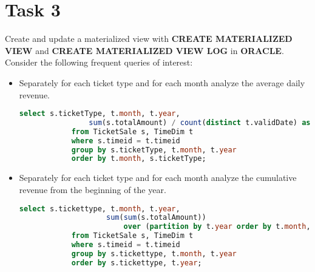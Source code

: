 \section{Task 3}

\begin{question}
   Create and update a materialized view with \textbf{CREATE MATERIALIZED VIEW} and
   \textbf{CREATE MATERIALIZED VIEW LOG} in \textbf{ORACLE}.\\
   Consider the following frequent queries of interest:
   \begin{itemize}
       \item
       Separately for each ticket type and for each month analyze the average daily
       revenue.
       \begin{lstlisting}[language=SQL]
            select s.ticketType, t.month, t.year,
                sum(s.totalAmount) / count(distinct t.validDate) as AVGDailyRevenue
            from TicketSale s, TimeDim t
            where s.timeid = t.timeid
            group by s.ticketType, t.month, t.year
            order by t.month, s.ticketType;
       \end{lstlisting}
       \item
       Separately for each ticket type and for each month analyze the cumulative revenue
       from the beginning of the year.
       \begin{lstlisting}[language=SQL]
            select s.tickettype, t.month, t.year,
                    sum(sum(s.totalAmount))
                        over (partition by t.year order by t.month, t.year) as AccRevenue
            from TicketSale s, TimeDim t
            where s.timeid = t.timeid
            group by s.tickettype, t.month, t.year
            order by s.tickettype, t.year;



\end{lstlisting}
\end{itemize}
\end{question}
